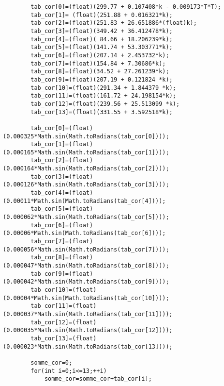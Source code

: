 \begin{lstlisting}
        tab_cor[0]=(float)(299.77 + 0.107408*k - 0.009173*T*T);
        tab_cor[1]= (float)(251.88 + 0.016321*k);
        tab_cor[2]=(float)(251.83 + 26.651886*(float)k);
        tab_cor[3]=(float)(349.42 + 36.412478*k);
        tab_cor[4]=(float)( 84.66 + 18.206239*k);
        tab_cor[5]=(float)(141.74 + 53.303771*k);
        tab_cor[6]=(float)(207.14 + 2.453732*k);
        tab_cor[7]=(float)(154.84 + 7.30686*k);
        tab_cor[8]=(float)(34.52 + 27.261239*k);
        tab_cor[9]=(float)(207.19 + 0.121824 *k);
        tab_cor[10]=(float)(291.34 + 1.844379 *k);
        tab_cor[11]=(float)(161.72 + 24.198154*k);
        tab_cor[12]=(float)(239.56 + 25.513099 *k);
        tab_cor[13]=(float)(331.55 + 3.592518*k);

        tab_cor[0]=(float)(0.000325*Math.sin(Math.toRadians(tab_cor[0])));
        tab_cor[1]=(float)(0.000165*Math.sin(Math.toRadians(tab_cor[1])));
        tab_cor[2]=(float)(0.000164*Math.sin(Math.toRadians(tab_cor[2])));
        tab_cor[3]=(float)(0.000126*Math.sin(Math.toRadians(tab_cor[3])));
        tab_cor[4]=(float)(0.00011*Math.sin(Math.toRadians(tab_cor[4])));
        tab_cor[5]=(float)(0.000062*Math.sin(Math.toRadians(tab_cor[5])));
        tab_cor[6]=(float)(0.00006*Math.sin(Math.toRadians(tab_cor[6])));
        tab_cor[7]=(float)(0.000056*Math.sin(Math.toRadians(tab_cor[7])));
        tab_cor[8]=(float)(0.000047*Math.sin(Math.toRadians(tab_cor[8])));
        tab_cor[9]=(float)(0.000042*Math.sin(Math.toRadians(tab_cor[9])));
        tab_cor[10]=(float)(0.00004*Math.sin(Math.toRadians(tab_cor[10])));
        tab_cor[11]=(float)(0.000037*Math.sin(Math.toRadians(tab_cor[11])));
        tab_cor[12]=(float)(0.000035*Math.sin(Math.toRadians(tab_cor[12])));
        tab_cor[13]=(float)(0.000023*Math.sin(Math.toRadians(tab_cor[13])));

        somme_cor=0;
        for(int i=0;i<=13;++i)
            somme_cor=somme_cor+tab_cor[i];


\end{lstlisting}
